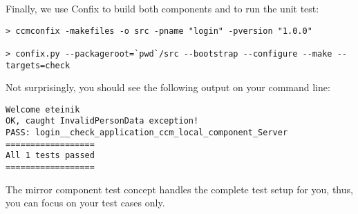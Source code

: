 \vspace{3mm}
Finally, we use Confix to build both components and to run the unit test:
\begin{footnotesize}
\begin{verbatim}
> ccmconfix -makefiles -o src -pname "login" -pversion "1.0.0"

> confix.py --packageroot=`pwd`/src --bootstrap --configure --make --targets=check
\end{verbatim}
\end{footnotesize}
Not surprisingly, you should see the following output on your command line:
\begin{footnotesize}
\begin{verbatim}
Welcome eteinik
OK, caught InvalidPersonData exception!
PASS: login__check_application_ccm_local_component_Server
==================
All 1 tests passed
==================
\end{verbatim}
\end{footnotesize}

The mirror component test concept handles the complete test setup for you, thus,
you can focus on your test cases only.

\newpage

